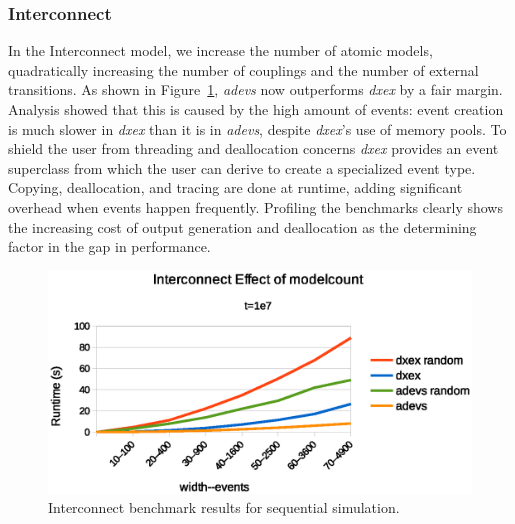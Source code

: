 \subsubsection{Interconnect}
\label{4-seq-Interconnect}
In the Interconnect model, we increase the number of atomic models, quadratically increasing the number of couplings and the number of external transitions.
As shown in Figure~\ref{fig:Interconnect_benchmark}, \textit{adevs} now outperforms \textit{dxex} by a fair margin.
Analysis showed that this is caused by the high amount of events: event creation is much slower in \textit{dxex} than it is in \textit{adevs}, despite \textit{dxex}'s use of memory pools.
To shield the user from threading and deallocation concerns \textit{dxex} provides an event superclass from which the user can derive to create a specialized event type.
Copying, deallocation, and tracing are done at runtime, adding significant overhead when events happen frequently.
Profiling the benchmarks clearly shows the increasing cost of output generation and deallocation as the determining factor in the gap in performance.

\begin{figure}
	\center
	\includegraphics[width=\columnwidth]{fig/interconnect_sequential.eps}
	\caption{Interconnect benchmark results for sequential simulation.}
	\label{fig:Interconnect_benchmark}
\end{figure}

